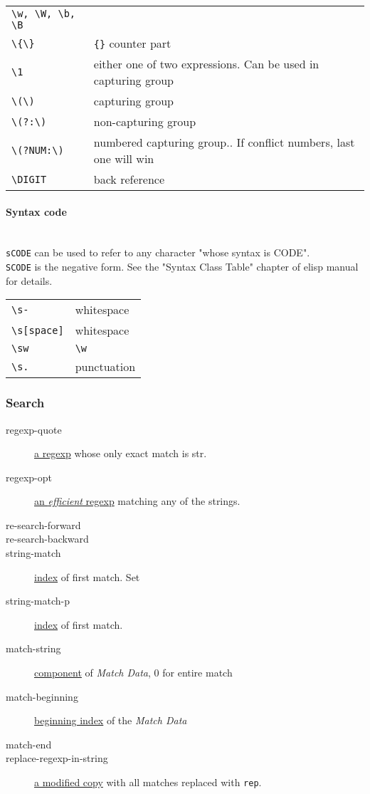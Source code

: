 \begin{tabular}{@{}ll@{}}
  \lstinline!\w, \W, \b, \B! &\\
  \lstinline!\{\}! & \lstinline!{}! counter part\\
  \lstinline!\1! & either one of two expressions. Can be used in capturing group\\
  \lstinline!\(\)! & capturing group\\
  \lstinline!\(?:\)! & non-capturing group\\
  \lstinline!\(?NUM:\)! & numbered capturing group.. If conflict numbers, last one will win\\
  \lstinline!\DIGIT! & back reference
\end{tabular}

\paragraph{Syntax code}
\texttt{\\sCODE} can be used to refer to any character "whose syntax is CODE".
\texttt{\\SCODE} is the negative form.
See the "Syntax Class Table" chapter of elisp manual for details.

\begin{tabular}{@{}ll@{}}
  \lstinline!\s-! & whitespace\\
  \lstinline!\s[space]! & whitespace\\
  \lstinline!\sw! & \lstinline!\w!\\
  \lstinline!\s.! & punctuation\\
\end{tabular}

\subsubsection{Search}
\begin{description}
\item[regexp-quote ] \uline{a regexp} whose only exact match is str.
\item[regexp-opt ] \uline{an \textit{efficient} regexp}
  matching any of the strings.
\item[re-search-forward ] 
\item[re-search-backward ] 
\item[string-match ] \uline{index} of first match.
  Set 
\item[string-match-p ] \uline{index} of first match.
\item[match-string ] \uline{component} of \textit{Match Data}, 0 for entire match
\item[match-beginning ] \uline{beginning index} of the \textit{Match Data}
\item[match-end ]
\item[replace-regexp-in-string ] \uline{a
    modified copy} with all matches replaced with \texttt{rep}.
\end{description}

